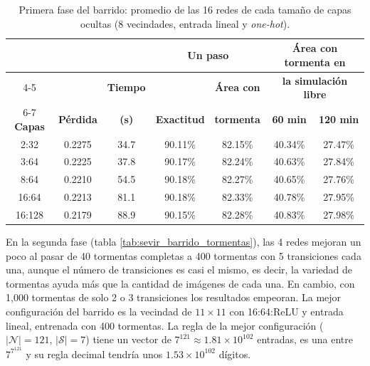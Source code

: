 \begin{table}[htbp]
	\centering
	\footnotesize
	\begin{tabular}{@{}ccccccc@{}}
		\toprule
		& & & \multicolumn{2}{c}{\textbf{Un paso}} & \multicolumn{2}{c}{\textbf{Área con tormenta en}} \\
		\cmidrule(lr){4-5}
		& & \textbf{Tiempo} & & \textbf{Área con} & \multicolumn{2}{c}{\textbf{la simulación libre}} \\
		\cmidrule(l){6-7}
		\textbf{Capas} & \textbf{Pérdida} & \textbf{(s)} & \textbf{Exactitud} & \textbf{tormenta} & \textbf{60 min} & \textbf{120 min} \\ \midrule
		2:32 & 0.2275 & 34.7 & 90.11\% & 82.15\% & 40.34\% & 27.47\% \\
		3:64 & 0.2225 & 37.8 & 90.17\% & 82.24\% & 40.63\% & 27.84\% \\
		8:64 & 0.2210 & 54.5 & 90.18\% & 82.27\% & 40.65\% & 27.76\% \\
		16:64 & 0.2213 & 81.1 & 90.18\% & 82.33\% & 40.78\% & 27.95\% \\
		16:128 & 0.2179 & 88.9 & 90.15\% & 82.28\% & 40.83\% & 27.98\% \\
		\bottomrule
	\end{tabular}
	\caption{Primera fase del barrido: promedio de las 16 redes de cada tamaño de capas ocultas (8 vecindades, entrada lineal y \textit{one-hot}).}
	\label{tab:sevir_barrido_capas}
\end{table}

En la segunda fase (tabla \ref{tab:sevir_barrido_tormentas}), las 4 redes mejoran un poco al pasar de 40 tormentas completas a 400 tormentas con 5 transiciones cada una, aunque el número de transiciones es casi el mismo, es decir, la variedad de tormentas ayuda más que la cantidad de imágenes de cada una. En cambio, con 1,000 tormentas de solo 2 o 3 transiciones los resultados empeoran. La mejor configuración del barrido es la vecindad de $11 \times 11$ con 16:64:ReLU y entrada lineal, entrenada con 400 tormentas. La regla de la mejor configuración ($|\mathcal{N}| = 121$, $|\mathcal{S}| = 7$) tiene un vector de $7^{121} \approx 1.81 \times 10^{102}$ entradas, es una entre $7^{7^{121}}$ y su regla decimal tendría unos $1.53 \times 10^{102}$ dígitos.

